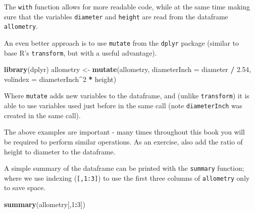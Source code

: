 \documentclass[]{book}
\newenvironment{Shaded}{\begin{snugshade}}{\end{snugshade}}
\newcommand{\DataTypeTok}[1]{\textcolor[rgb]{0.13,0.29,0.53}{#1}}
\newcommand{\DecValTok}[1]{\textcolor[rgb]{0.00,0.00,0.81}{#1}}
\newcommand{\FloatTok}[1]{\textcolor[rgb]{0.00,0.00,0.81}{#1}}
\newcommand{\KeywordTok}[1]{\textcolor[rgb]{0.13,0.29,0.53}{\textbf{#1}}}
\newcommand{\NormalTok}[1]{#1}
\newcommand{\OperatorTok}[1]{\textcolor[rgb]{0.81,0.36,0.00}{\textbf{#1}}}
\newcommand{\StringTok}[1]{\textcolor[rgb]{0.31,0.60,0.02}{#1}}
\let\BeginKnitrBlock\begin \let\EndKnitrBlock\end
\begin{document}
\begin{Shaded}
\end{Shaded}

The \texttt{with} function allows for more readable code, while at the same time making sure that the variables \texttt{diameter} and \texttt{height} are read from the dataframe \texttt{allometry}.

An even better approach is to use \texttt{mutate} from the \texttt{dplyr} package (similar to base R's \texttt{transform}, but with a useful advantage).

\begin{Shaded}
\begin{Highlighting}[]
\KeywordTok{library}\NormalTok{(dplyr)}
\NormalTok{allometry <-}\StringTok{ }\KeywordTok{mutate}\NormalTok{(allometry, }
                \DataTypeTok{diameterInch =}\NormalTok{ diameter }\OperatorTok{/}\StringTok{ }\FloatTok{2.54}\NormalTok{,}
                \DataTypeTok{volindex =}\NormalTok{ diameterInch}\OperatorTok{^}\DecValTok{2} \OperatorTok{*}\StringTok{ }\NormalTok{height)}
\end{Highlighting}
\end{Shaded}

Where \texttt{mutate} adds new variables to the dataframe, and (unlike \texttt{transform}) it is able to use variables used just before in the same call (note \texttt{diameterInch} was created in the same call).

\BeginKnitrBlock{rmdtry}
The above examples are important - many times throughout this book you will be required to perform similar operations. As an exercise, also add the ratio of height to diameter to the dataframe.
\EndKnitrBlock{rmdtry}

A simple summary of the dataframe can be printed with the \texttt{summary} function; where we use indexing (\texttt{{[},1:3{]}}) to use the first three columns of \texttt{allometry} only to save space.

\begin{Shaded}
\begin{Highlighting}[]
\KeywordTok{summary}\NormalTok{(allometry[,}\DecValTok{1}\OperatorTok{:}\DecValTok{3}\NormalTok{])}
\end{Highlighting}
\end{Shaded}
\end{document}
